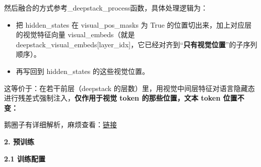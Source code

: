 \documentclass[zihao=false,fontset=windows]{ctexart}
\begin{document}
然后融合的方式参考\_deepstack\_process函数，具体处理逻辑为：\par

\begin{itemize}[label=\textcolor{feishuBlue}{\textbullet}]
\item 把 hidden\_states 在 visual\_pos\_masks 为 True 的位置切出来，加上对应层的视觉特征向量 visual\_embeds（就是 deepstack\_visual\_embeds[layer\_idx]，它已经对齐到“\textcolor{feishuRed}{\textbf{只有视觉位置}}”的子序列顺序）。

\end{itemize}

\begin{itemize}[label=\textcolor{feishuBlue}{\textbullet}]
\item 再写回到 hidden\_states 的这些视觉位置。

\end{itemize}

这等价于：在若干前层（deepstack 的层数）里，用视觉中间层特征对语言隐藏态进行残差式强制注入，\textcolor{feishuRed}{\textbf{仅作用于视觉 token 的那些位置，文本 token 位置不变：}}\par



\Needspace{2cm}\par\vspace{0.9em}\par\vspace{0.28em}

鹅圈子有详细解析，麻烦查看：\href{https://appttaswqlt5080.h5.xet.citv.cn/xe.community.community_service/v2/feedDetail?app_id=appttaswqlt5080&community_id=c_68afda70f9bc6_x29igT7o2026&feed_id=d_693f158d4bd48_CMsdjT4h3woi&share_user_id=&share_type=}{链接}\par


\Needspace{6cm}\par\vspace{0.9em}\begin{tcolorbox}[enhanced,colback=headRed,boxrule=0pt,arc=4pt,boxsep=0pt,left=3pt,right=3pt,top=2pt,bottom=2pt,before skip=0pt,after skip=3pt]\bfseries \textcolor{feishuBlue}{2.} 预训练\end{tcolorbox}

\Needspace{2cm}\par\vspace{0.9em}\begin{tcolorbox}[enhanced,colback=headOrange,boxrule=0pt,arc=4pt,boxsep=0pt,left=3pt,right=3pt,top=2pt,bottom=2pt,before skip=0pt,after skip=3pt]\bfseries \textcolor{feishuBlue}{2.1} 训练配置\end{tcolorbox}
\end{document}
